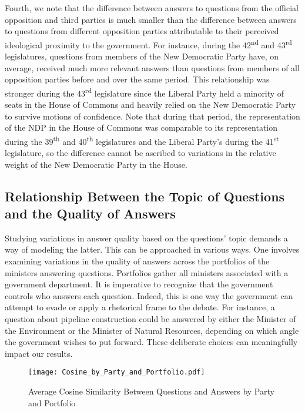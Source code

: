 {{Fourth, we note that the difference between answers to questions from the official opposition and third parties is much smaller than the difference between answers to questions from different opposition parties attributable to their perceived ideological proximity to the government. For instance, during the 42\textsuperscript{nd} and 43\textsuperscript{rd} legislatures, questions from members of the New Democratic Party have, on average, received much more relevant answers than questions from members of all opposition parties before and over the same period. This relationship was stronger during the 43\textsuperscript{rd} legislature since the Liberal Party held a minority of seats in the House of Commons and heavily relied on the New Democratic Party to survive motions of confidence. Note that during that period, the representation of the NDP in the House of Commons was comparable to its representation during the 39\textsuperscript{th} and 40\textsuperscript{th} legislatures and the Liberal Party’s during the 41\textsuperscript{st} legislature, so the difference cannot be ascribed to variations in the relative weight of the New Democratic Party in the House.

\subsection*{Relationship Between the Topic of Questions and the Quality of Answers}

Studying variations in answer quality based on the questions' topic demands a way of modeling the latter. This can be approached in various ways. One involves examining variations in the quality of answers across the portfolios of the ministers answering questions. Portfolios gather all ministers associated with a government department. It is imperative to recognize that the government controls who answers each question. Indeed, this is one way the government can attempt to evade or apply a rhetorical frame to the debate. For instance, a question about pipeline construction could be answered by either the Minister of the Environment or the Minister of Natural Resources, depending on which angle the government wishes to put forward. These deliberate choices can meaningfully impact our results.

\begin{figure}[!tbp]
    \centering
    \texttt{[image: Cosine\_by\_Party\_and\_Portfolio.pdf]}
    \caption{Average Cosine Similarity Between Questions and Answers by Party and Portfolio}
    \label{fig:cosine_by_portfolio}
\end{figure}

}}
